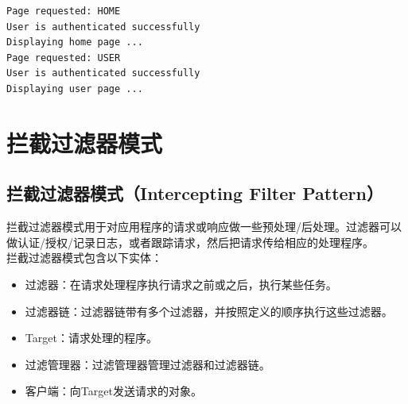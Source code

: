 \begin{tcolorbox}
    \begin{verbatim}
Page requested: HOME
User is authenticated successfully
Displaying home page ...
Page requested: USER
User is authenticated successfully
Displaying user page ...
\end{verbatim}
\end{tcolorbox}

\newpage

\section{拦截过滤器模式}

\subsection{拦截过滤器模式（Intercepting Filter Pattern）}

拦截过滤器模式用于对应用程序的请求或响应做一些预处理/后处理。过滤器可以做认证/授权/记录日志，或者跟踪请求，然后把请求传给相应的处理程序。\\

拦截过滤器模式包含以下实体：

\begin{itemize}
    \item 过滤器：在请求处理程序执行请求之前或之后，执行某些任务。

    \item 过滤器链：过滤器链带有多个过滤器，并按照定义的顺序执行这些过滤器。

    \item Target：请求处理的程序。

    \item 过滤管理器：过滤管理器管理过滤器和过滤器链。

    \item 客户端：向Target发送请求的对象。
\end{itemize}

\vspace{0.5cm}

\\

